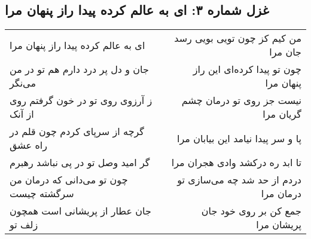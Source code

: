 \begin{center}
\section*{غزل شماره ۳: ای به عالم کرده پیدا راز پنهان مرا}
\label{sec:003}
\begin{longtable}{l p{0.5cm} r}
ای به عالم کرده پیدا راز پنهان مرا
&&
من کیم کز چون تویی بویی رسد جان مرا
\\
جان و دل پر درد دارم هم تو در من می‌نگر
&&
چون تو پیدا کرده‌ای این راز پنهان مرا
\\
ز آرزوی روی تو در خون گرفتم روی از آنک
&&
نیست جز روی تو درمان چشم گریان مرا
\\
گرچه از سرپای کردم چون قلم در راه عشق
&&
پا و سر پیدا نیامد این بیابان مرا
\\
گر امید وصل تو در پی نباشد رهبرم
&&
تا ابد ره درکشد وادی هجران مرا
\\
چون تو می‌دانی که درمان من سرگشته چیست
&&
دردم از حد شد چه می‌سازی تو درمان مرا
\\
جان عطار از پریشانی است همچون زلف تو
&&
جمع کن بر روی خود جان پریشان مرا
\\
\end{longtable}
\end{center}
